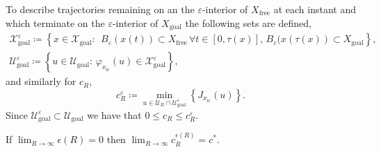 \documentclass{llncs}
\begin{document}
To describe trajectories remaining on an the $\varepsilon$-interior of $X_\mathrm{free}$ at each instant and which terminate on the $\varepsilon$-interior of $X_\mathrm{goal}$ the following sets are defined,
\begin{equation}
\begin{array}{l}
\mathcal{X}_\mathrm{goal}^{\varepsilon}\coloneqq\left\{ x\in\mathcal{X}_\mathrm{goal}:\,\; B_{\varepsilon}(x(t))\subset X_\mathrm{free}\, \forall t\in[0,\tau(x)], \, B_{\varepsilon}(x(\tau(x))\subset X_\mathrm{goal}\right\} ,\\
\mathcal{U}_\mathrm{goal}^{\varepsilon}\coloneqq\left\{ u\in\mathcal{U}_\mathrm{goal}:\,\varphi_{x_\mathrm{ic}}(u)\in\mathcal{X}_\mathrm{goal}^{\varepsilon}\right\} ,
\end{array}\label{eq:interiors}
\end{equation}
and similarly for $c_{R}$,
\begin{equation}
c_{R}^{\varepsilon}\coloneqq\min_{u\in\mathcal{U}_{R}\cap\mathcal{U}_\mathrm{goal}^{\varepsilon}}\left\{ J_{x_\mathrm{ic}}(u)\right\} .\label{eq:cr_ep}
\end{equation}
 Since $\ensuremath{\mathcal{U}_\mathrm{goal}^{\varepsilon}\subset\mathcal{U}_\mathrm{goal}}$
we have that $0\leq c_{R}\leq c_{R}^{\varepsilon}$. 
\begin{lemma}
\label{lem:approx_equal_optimal}If $\lim_{R\rightarrow\infty}\epsilon(R)=0$
then $\lim_{R\rightarrow\infty}c_{R}^{\epsilon(R)}=c^{*}$.\end{lemma}
\end{document}
